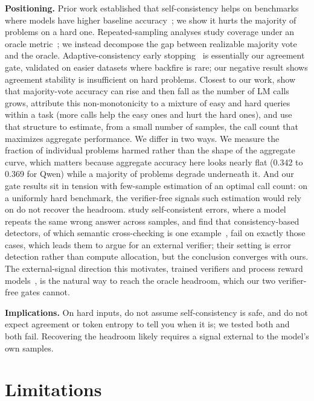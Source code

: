 \documentclass{article}
\begin{document}
\textbf{Positioning.} Prior work established that self-consistency helps on
benchmarks where models have higher baseline
accuracy~\citep{wang2023self}; we show it hurts the majority of problems on a
hard one. Repeated-sampling analyses study coverage under an oracle
metric~\citep{brown2024large}; we instead decompose the gap between realizable
majority vote and the oracle. Adaptive-consistency early
stopping~\citep{aggarwal2023adaptive} is essentially our agreement gate,
validated on easier datasets where backfire is rare; our negative result shows
agreement stability is insufficient on hard problems. Closest to our work,
\citet{chen2024more} show that majority-vote accuracy can rise and then fall
as the number of LM calls grows, attribute this non-monotonicity to a mixture
of easy and hard queries within a task (more calls help the easy ones and hurt
the hard ones), and use that structure to estimate, from a small number of
samples, the call count that maximizes aggregate performance. We differ in two
ways. We measure the fraction of individual problems harmed rather than the
shape of the aggregate curve, which matters because aggregate accuracy here
looks nearly flat (0.342 to 0.369 for Qwen) while a majority of problems
degrade underneath it. And our gate results sit in tension with few-sample
estimation of an optimal call count: on a uniformly hard benchmark, the
verifier-free signals such estimation would rely on do not recover the
headroom. \citet{tan2025consistent} study self-consistent errors, where a
model repeats the same wrong answer across samples, and find that
consistency-based detectors, of which semantic cross-checking is one
example~\citep{zhang2023sac3}, fail on exactly those cases, which leads them to
argue for an external verifier; their setting is error detection rather than
compute allocation, but the conclusion converges with ours. The external-signal
direction this motivates, trained verifiers and process reward
models~\citep{cobbe2021training, lightman2023verify}, is the natural way to
reach the oracle headroom, which our two verifier-free gates cannot.

\textbf{Implications.} On hard inputs, do not assume self-consistency is safe,
and do not expect agreement or token entropy to tell you when it is; we tested
both and both fail. Recovering the headroom likely requires a signal external
to the model's own samples.

\section{Limitations}
\end{document}
